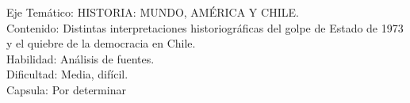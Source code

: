 \documentclass[letterpaper,11pt]{article}
\newcommand{\anchopregunta}{0.9\textwidth}
\begin{document}
\begin{enumerate}
\begin{minipage}{\anchopregunta}
\begin{answer}
\end{answer}
\begin{info} %
\begin{flushleft}
Eje Temático: HISTORIA: MUNDO, AMÉRICA Y CHILE.\\
Contenido: Distintas interpretaciones historiográficas del golpe de Estado de 1973 y el quiebre de la democracia en Chile.\\
Habilidad: Análisis de fuentes.\\
Dificultad: Media, difícil.\\
Capsula: Por determinar \\
\end{flushleft} 
\end{info}
\end{minipage}\vfill$\;$ %


\end{enumerate}
\end{document}
